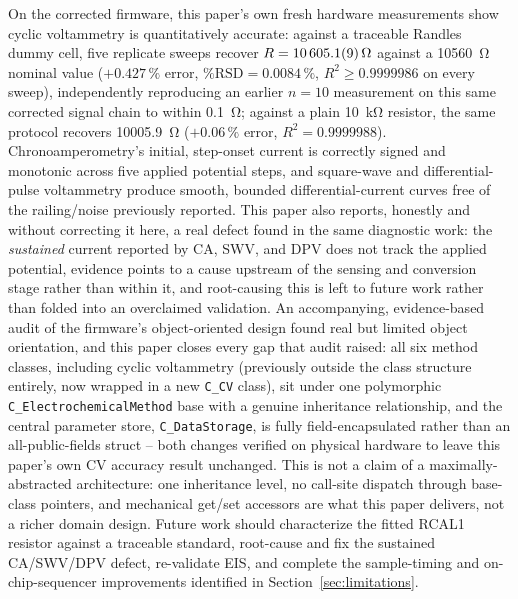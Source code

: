 On the corrected firmware, this paper's own fresh hardware measurements
show cyclic voltammetry is quantitatively accurate: against a traceable
Randles dummy cell, five replicate sweeps recover
$R=\SI{10605.1\pm0.9}{\ohm}$ against a \SI{10560}{\ohm} nominal value
($+0.427\,\%$ error, $\%\mathrm{RSD}=0.0084\,\%$, $R^2\geq0.9999986$ on
every sweep), independently reproducing an earlier $n=10$ measurement on
this same corrected signal chain to within \SI{0.1}{\ohm}; against a plain
\SI{10}{\kilo\ohm} resistor, the same protocol recovers \SI{10005.9}{\ohm}
($+0.06\,\%$ error, $R^2=0.9999988$). Chronoamperometry's initial,
step-onset current is correctly signed and monotonic across five applied
potential steps, and square-wave and differential-pulse voltammetry
produce smooth, bounded differential-current curves free of the
railing/noise previously reported. This paper also reports, honestly and
without correcting it here, a real defect found in the same diagnostic
work: the \emph{sustained} current reported by CA, SWV, and DPV does not
track the applied potential, evidence points to a cause upstream of the
sensing and conversion stage rather than within it, and root-causing this
is left to future work rather than folded into an overclaimed validation.
An accompanying, evidence-based audit of the firmware's object-oriented
design found real but limited object orientation, and this paper closes
every gap that audit raised: all six method classes, including cyclic
voltammetry (previously outside the class structure entirely, now wrapped
in a new \texttt{C\_CV} class), sit under one polymorphic
\texttt{C\_ElectrochemicalMethod} base with a genuine inheritance
relationship, and the central parameter store, \texttt{C\_DataStorage}, is
fully field-encapsulated rather than an all-public-fields struct -- both
changes verified on physical hardware to leave this paper's own CV
accuracy result unchanged. This is not a claim of a maximally-abstracted
architecture: one inheritance level, no call-site dispatch through
base-class pointers, and mechanical get/set accessors are what this paper
delivers, not a richer domain design. Future work should characterize the
fitted RCAL1 resistor against a traceable standard, root-cause and fix the
sustained CA/SWV/DPV defect, re-validate EIS, and complete the
sample-timing and on-chip-sequencer improvements identified in
Section~\ref{sec:limitations}.
